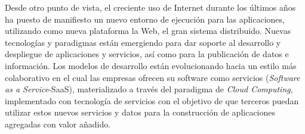 \documentclass[a4paper,twoside,12pt]{report}
\begin{document}
Desde otro punto de vista, el creciente uso de Internet durante los últimos años ha puesto de manifiesto un
nuevo entorno de ejecución para las aplicaciones, utilizando como nueva
plataforma la Web, el gran sistema distribuido. Nuevas tecnologías y paradigmas
están emergiendo para dar soporte al desarrollo y despliegue de aplicaciones y
servicios, así como para la publicación de datos e información. Los modelos de
desarrollo están evolucionando hacia un estilo más colaborativo en el cual las empresas
ofrecen su software como servicios (\textit{Software as a Service}-\gls{SaaS}), materializado a
través del paradigma de \textit{Cloud Computing}, implementado con tecnología de
servicios con el objetivo de que terceros puedan utilizar estos nuevos servicios y datos para
la construcción de aplicaciones agregadas con valor añadido. 
\end{document}
